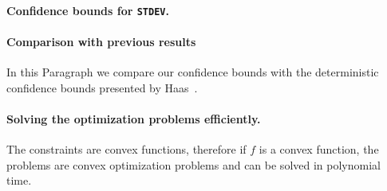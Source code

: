 \paragraph{Confidence bounds for \texttt{STDEV}.} 

\paragraph{Comparison with previous results} In this Paragraph we
compare our confidence bounds with the deterministic confidence bounds presented
by Haas~\cite{Haas97}. 


\paragraph{Solving the optimization problems efficiently.} The constraints are convex
functions, therefore if $f$ is a convex function, the problems are
convex optimization problems and can be solved in polynomial time.

